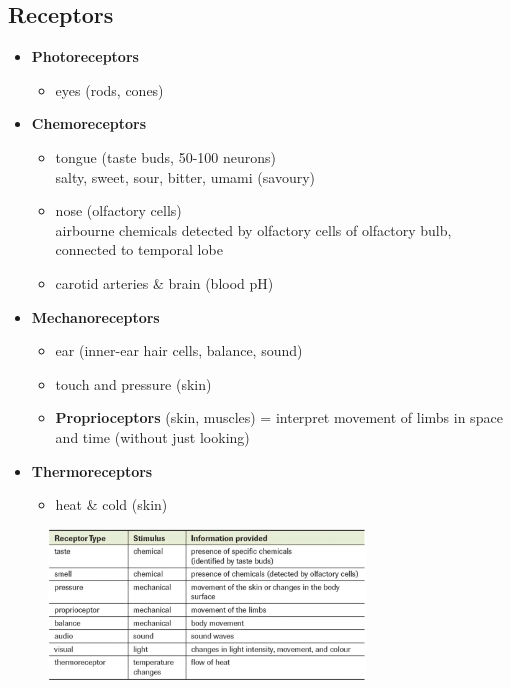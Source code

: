 \documentclass[a4paper,12pt]{article}
\begin{document}
\subsection{Receptors}
\begin{itemize}
    \item{
            \textbf{Photoreceptors}
            \begin{itemize}
                \item{eyes (rods, cones)}
            \end{itemize}
        }
    \item{
            \textbf{Chemoreceptors}
            \begin{itemize}
                \item{tongue (taste buds, 50-100 neurons) \\ salty, sweet, sour, bitter, umami (savoury)}
                \item{nose (olfactory cells) \\ airbourne chemicals detected by olfactory cells of olfactory bulb, connected to temporal lobe}
                \item{carotid arteries \& brain (blood pH)}
            \end{itemize}
        }
    \item{
            \textbf{Mechanoreceptors}
            \begin{itemize}
                \item{ear (inner-ear hair cells, balance, sound)}
                \item{touch and pressure (skin)}
                \item{\textbf{Proprioceptors} (skin, muscles) = interpret movement of limbs in space and time (without just looking)}
            \end{itemize}
        }
    \item{
            \textbf{Thermoreceptors}
            \begin{itemize}
                \item{heat \& cold (skin)}
            \end{itemize}
        }
\end{itemize}

\begin{figure}[H]
    \centering
    \includegraphics[width=0.75\textwidth]{sense-summary}
\end{figure}
\end{document}
